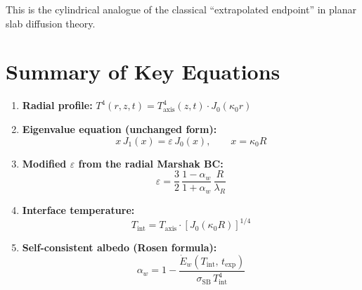 \documentclass[12pt]{article}
\newcommand{\sSB}{\sigma_{\mathrm{SB}}}
\newcommand{\lR}{\lambda_R}
\newcommand{\alphaW}{\alpha_w}
\newcommand{\Ew}{\dot{E}_w}
\begin{document}
This is the cylindrical analogue of the classical ``extrapolated endpoint''
in planar slab diffusion theory.


\section{Summary of Key Equations}

\begin{enumerate}
    \item \textbf{Radial profile:} $T^4(r,z,t) = T_{\mathrm{axis}}^4(z,t)\cdot J_0(\kappa_0 r)$

    \item \textbf{Eigenvalue equation (unchanged form):}
    \begin{equation*}
        x\,J_1(x) = \varepsilon\,J_0(x), \qquad x = \kappa_0 R
    \end{equation*}

    \item \textbf{Modified $\varepsilon$ from the radial Marshak BC:}
    \begin{equation*}
        \varepsilon = \frac{3}{2}\,\frac{1 - \alphaW}{1 + \alphaW}\,\frac{R}{\lR}
    \end{equation*}

    \item \textbf{Interface temperature:}
    \begin{equation*}
        T_{\mathrm{int}} = T_{\mathrm{axis}}\cdot\left[J_0(\kappa_0 R)\right]^{1/4}
    \end{equation*}

    \item \textbf{Self-consistent albedo (Rosen formula):}
    \begin{equation*}
        \alphaW = 1 - \frac{\Ew(T_{\mathrm{int}},\,t_{\mathrm{exp}})}
        {\sSB\,T_{\mathrm{int}}^4}
    \end{equation*}
\end{enumerate}
\end{document}
